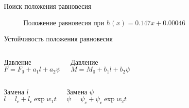 \documentclass[ignoreonframetext,unicode]{beamer}
\begin{document}
\begin{frame}{Поиск положения равновесия}
\vspace*{-1mm}
\begin{figure}[!htbp]
	\caption{Положение равновесия при $h(x) = 0.147 x + 0.00046$}
	\label{res_chasdasdaeck_func_2}
\end{figure}



\end{frame}

\begin{frame}{Устойчивость положения равновесия}
	\vspace*{-3mm}
	\begin{columns}
		
	\begin{block}{Давление}
		\vspace*{2mm}
		\begin{equation*}
			F = F_0 + a_1 l + a_2 \psi
			\label{kjdkjsnadkjadsbafabjb}
		\end{equation*}
	\end{block}

	\begin{block}{Давление}
		\vspace*{2mm}
		\begin{equation*}
			M = M_0 + b_1 l + b_2 \psi
			\label{kjdkjsasdsanadkjadsbafabjb}
		\end{equation*}
	\end{block}
	
	\end{columns}

\vspace*{-2mm}
\begin{columns}
	
	\column{0.5\textwidth}
	\begin{block}{Замена $l$}
		\vspace*{2mm}
		\begin{equation*}
			l = l_c + l_c \exp{w_1 t}
			\label{kjdkjsnadkjddadsbafabjb}
		\end{equation*}
	\end{block}
	
	\column{0.5\textwidth}
	\begin{block}{Замена $\psi$}
		\vspace*{2mm}
		\begin{equation*}
			\psi = \psi_c +  \psi_c \exp{w_2 t}
			\label{kjdkjsasdsssanadkjadsbafabjb}
		\end{equation*}
	\end{block}
	

\end{columns}
\end{frame}
\end{document}
